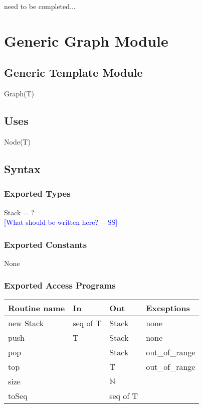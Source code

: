 \documentclass[12pt]{article}
\newcommand{\authornote}[3]{\textcolor{#1}{[#3 ---#2]}}
\newcommand{\authornote}[3]{}
\newcommand{\wss}[1]{\authornote{blue}{SS}{#1}}
\begin{document}
need to be completed...

\newpage

\section* {Generic Graph Module}

\subsection* {Generic Template Module}

Graph(T)

\subsection* {Uses}

Node(T)

\subsection* {Syntax}

\subsubsection* {Exported Types}

Stack = ? \\

\wss{What should be written here?}

\subsubsection* {Exported Constants}

None

\subsubsection* {Exported Access Programs}

\begin{tabular}{| l | l | l | p{5cm} |}
\hline
\textbf{Routine name} & \textbf{In} & \textbf{Out} & \textbf{Exceptions}\\
\hline
new Stack & seq of T & Stack & none\\
\hline
push & T & Stack & none\\
\hline
pop & & Stack & out\_of\_range\\
\hline
top & & T & out\_of\_range\\
\hline
size & & $\mathbb{N}$ & \\
\hline
toSeq& & seq of T & \\
\hline
\end{tabular}
\end{document}
